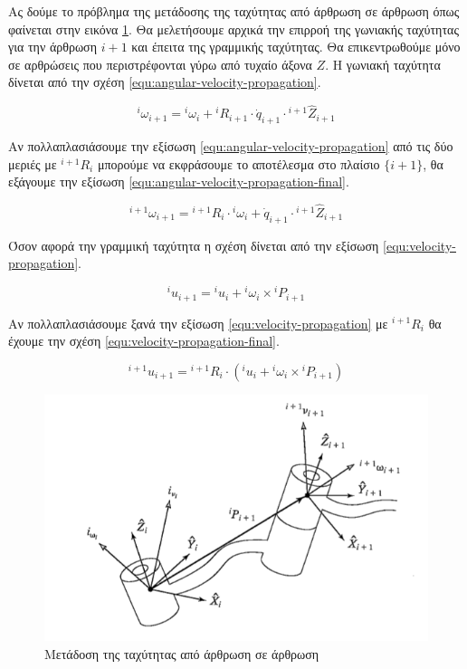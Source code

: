 Ας δούμε το πρόβλημα της μετάδοσης της ταχύτητας από άρθρωση σε άρθρωση όπως φαίνεται στην εικόνα \ref{fig:velocity-transfer}. Θα μελετήσουμε αρχικά την επιρροή της γωνιακής ταχύτητας για την άρθρωση $i+1$ και έπειτα της γραμμικής ταχύτητας. Θα επικεντρωθούμε μόνο σε αρθρώσεις που περιστρέφονται γύρω από τυχαίο άξονα $Ζ$. Η γωνιακή ταχύτητα δίνεται από την σχέση \ref{equ:angular-velocity-propagation}.

\begin{equation}
    ^i\omega_{i+1} = {}^i\omega_i + {}^iR_{i+1} \cdot \dot{q}_{i+1}
    \cdot {}^{i+1}\hat{Z}_{i+1}
    \label{equ:angular-velocity-propagation}
\end{equation}

Αν πολλαπλασιάσουμε την εξίσωση \ref{equ:angular-velocity-propagation} από τις δύο μεριές με $^{i+1}R_i$ μπορούμε να εκφράσουμε το αποτέλεσμα στο πλαίσιο $\{i+1\}$, θα εξάγουμε την εξίσωση \ref{equ:angular-velocity-propagation-final}.

\begin{equation}
    ^{i+1}\omega_{i+1} = {}^{i+1}R_i \cdot {}^i\omega_i + \dot{q}_{i+1}
    \cdot {}^{i+1}\hat{Z}_{i+1}
    \label{equ:angular-velocity-propagation-final}
\end{equation}

Όσον αφορά την γραμμική ταχύτητα η σχέση δίνεται από την εξίσωση \ref{equ:velocity-propagation}.

\begin{equation}
    ^iu_{i+1} = {}^iu_i + {}^i\omega_i \times {}^iP_{i+1}
    \label{equ:velocity-propagation}
\end{equation}

Αν πολλαπλασιάσουμε ξανά την εξίσωση \ref{equ:velocity-propagation} με $^{i+1}R_i$ θα έχουμε την σχέση \ref{equ:velocity-propagation-final}.

\begin{equation}
    ^{i+1}u_{i+1} = {}^{i+1}R_i \cdot (^iu_i + {}^i\omega_i \times
    {}^iP_{i+1})
    \label{equ:velocity-propagation-final}
\end{equation}

\begin{figure}[H]
    \centering
    \includegraphics[width=.8\textwidth, keepaspectratio]{fig/velocity-transfer.png}
    \caption{Μετάδοση της ταχύτητας από άρθρωση σε άρθρωση \cite{craig95}}
    \label{fig:velocity-transfer}
\end{figure}

